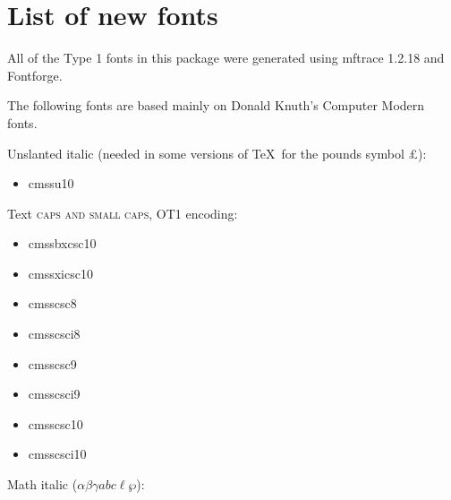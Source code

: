 \documentclass{amsart}
\begin{document}
\section{List of new fonts}\label{sec:fonts}

All of the Type 1 fonts in this package were generated using mftrace 1.2.18 and Fontforge.

The following fonts are based mainly on Donald Knuth's Computer Modern fonts.

\textsf{\selectfont Unslanted italic} (needed in some versions of \TeX\ for the pounds symbol \textsf{\pounds}):

\nobreak

\noindent{}\textwidth\parbox[t]{0.235\textwidth}{
\begin{itemize}[leftmargin=*]
\item \textsf{cmssu10}
\end{itemize}}

\bigskip

Text \textsf{\textsc{caps and small caps}}, OT1 encoding:

\nobreak

\noindent{}\textwidth\parbox[t]{0.235\textwidth}{
\begin{itemize}[leftmargin=*]
\item \textsf{cmssbxcsc10}
\item \textsf{cmssxicsc10}
\end{itemize}}\parbox[t]{0.235\textwidth}{\begin{itemize}[leftmargin=*]
\item \textsf{cmsscsc8}
\item \textsf{cmsscsci8}
\end{itemize}}\parbox[t]{0.235\textwidth}{\begin{itemize}[leftmargin=*]
\item \textsf{cmsscsc9}
\item \textsf{cmsscsci9}
\end{itemize}}\parbox[t]{0.235\textwidth}{\begin{itemize}[leftmargin=*]
\item \textsf{cmsscsc10}
\item \textsf{cmsscsci10}
\end{itemize}}

\bigskip

Math italic ($\alpha \beta \gamma abc \ell \wp$):

\nobreak
\end{document}
